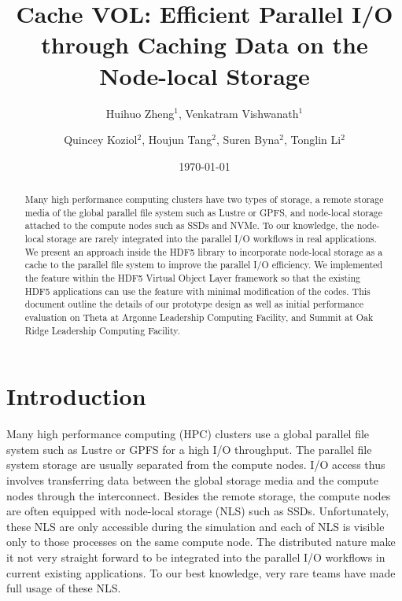 \documentclass[aps, prb, 11pt, notitlepage]{revtex4-1}
\begin{document}
\title{Cache VOL: Efficient Parallel I/O through Caching Data on the Node-local Storage}
\author{Huihuo Zheng$^1$, Venkatram Vishwanath$^1$}
\author{Quincey Koziol$^2$, Houjun Tang$^2$, Suren Byna$^2$, Tonglin Li$^2$}
\date{\today}
\begin{abstract}
Many high performance computing clusters have two types of storage, a remote storage media of the global parallel file system such as Lustre or GPFS, and node-local storage attached to the compute nodes such as SSDs and NVMe. To our knowledge, the node-local storage are rarely integrated into the parallel I/O workflows in real applications. We present an approach inside the HDF5 library to incorporate node-local storage as a cache to the parallel file system to improve the parallel I/O efficiency. We implemented the feature within the HDF5 Virtual Object Layer framework so that the existing HDF5 applications can use the feature with minimal modification of the codes. This document outline the details of our prototype design as well as initial performance evaluation on Theta at Argonne Leadership Computing Facility, and Summit at Oak Ridge Leadership Computing Facility. 
\end{abstract}
\maketitle
\section{Introduction}
\label{sec:intro}
Many high performance computing (HPC) clusters use a global parallel file system such as Lustre or GPFS for a high I/O throughput. The parallel file system storage are usually separated from the compute nodes. I/O access thus involves transferring data between the global storage media and the compute nodes through the interconnect. Besides the remote storage, the compute nodes are often equipped with node-local storage (NLS) such as SSDs.\cite{theta, summit}
Unfortunately, these NLS are only accessible during the simulation and each of NLS is visible only to those processes on the same compute node. The distributed nature make it not very straight forward to be integrated into the parallel I/O workflows in current existing applications. To our best knowledge, very rare teams have made full usage of these NLS. 
\end{document}
